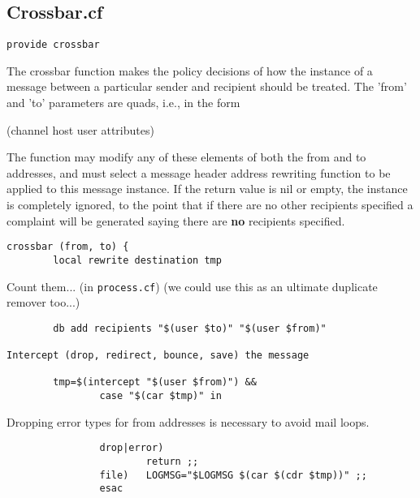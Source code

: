 \subsection{Crossbar.cf}



\begin{tscreen}
\begin{verbatim}
provide crossbar
\end{verbatim}
\end{tscreen}


The crossbar function makes the policy decisions of how the instance of
a message between a particular sender and recipient should be treated.
The 'from' and 'to' parameters are quads, i.e., in the form

(channel host user attributes)

The function may modify any of these elements of both the from and to
addresses, and must select a message header address rewriting function
to be applied to this message instance.  If the return value is nil or
empty, the instance is completely ignored, to the point that if there are
no other recipients specified a complaint will be generated saying there
are {\bf no} recipients specified.

\begin{tscreen}
\begin{verbatim}
crossbar (from, to) {
        local rewrite destination tmp
\end{verbatim}
\end{tscreen}


Count them...  (in {\tt process.cf})
(we could use this as an ultimate duplicate remover too...)

\begin{tscreen}
\begin{verbatim}
        db add recipients "$(user $to)" "$(user $from)"

Intercept (drop, redirect, bounce, save) the message

        tmp=$(intercept "$(user $from)") &&
                case "$(car $tmp)" in
\end{verbatim}
\end{tscreen}

Dropping error types for from addresses is necessary to avoid mail loops.
\begin{tscreen}
\begin{verbatim}
                drop|error)
                        return ;;
                file)   LOGMSG="$LOGMSG $(car $(cdr $tmp))" ;;
                esac
\end{verbatim}
\end{tscreen}


